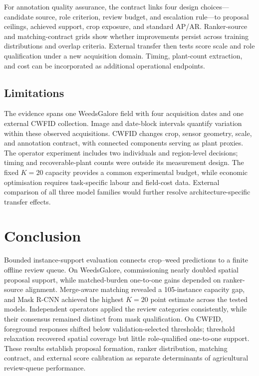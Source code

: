 \documentclass[preprint,12pt]{elsarticle}
\begin{document}
For annotation quality assurance, the contract links four design choices---candidate source, role criterion, review budget, and escalation rule---to proposal ceilings, achieved support, crop exposure, and standard AP/AR. Ranker-source and matching-contract grids show whether improvements persist across training distributions and overlap criteria. External transfer then tests score scale and role qualification under a new acquisition domain. Timing, plant-count extraction, and cost can be incorporated as additional operational endpoints.

\subsection{Limitations}

The evidence spans one WeedsGalore field with four acquisition dates and one external CWFID collection. Image and date-block intervals quantify variation within these observed acquisitions. CWFID changes crop, sensor geometry, scale, and annotation contract, with connected components serving as plant proxies. The operator experiment includes two individuals and region-level decisions; timing and recoverable-plant counts were outside its measurement design. The fixed $K=20$ capacity provides a common experimental budget, while economic optimisation requires task-specific labour and field-cost data. External comparison of all three model families would further resolve architecture-specific transfer effects.

\section{Conclusion}

Bounded instance-support evaluation connects crop--weed predictions to a finite offline review queue. On WeedsGalore, commissioning nearly doubled spatial proposal support, while matched-burden one-to-one gains depended on ranker-source alignment. Merge-aware matching revealed a 105-instance capacity gap, and Mask R-CNN achieved the highest $K=20$ point estimate across the tested models. Independent operators applied the review categories consistently, while their consensus remained distinct from mask qualification. On CWFID, foreground responses shifted below validation-selected thresholds; threshold relaxation recovered spatial coverage but little role-qualified one-to-one support. These results establish proposal formation, ranker distribution, matching contract, and external score calibration as separate determinants of agricultural review-queue performance.
\end{document}
